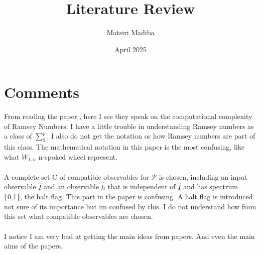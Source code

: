 \documentclass[12pt, a4paper]{Assignment}
\author{Matsiri Madiba}
\date{April 2025}
\title{Literature Review}
\begin{document}
\maketitle
\section*{Comments}

From reading the paper \cite{burr1981generalized}, here I see they speak on the computational complexity of Ramsey Numbers. 
I have a little trouble in understanding Ramsey numbers as a class of $\sum_{2}^{p}$. 
I also do not get the notation or how Ramsey numbers are part of this class.
The mathematical notation in this paper is the most confusing, like what $W_{1,n}$ n-spoked wheel represent.
\\
\\
\cite{Deutsch1989}
A complete set C of compatible observables for $\mathcal{P}$ is chosen, including an input 
observable $\hat{I}$ and an observable $\hat{h}$ that is independent of $\hat{I}$ and has spectrum \{0,1\}, the halt flag. 
This part in the paper is confusing.
A halt flag is introduced not sure of its importance but im confused by this.
I do not understand how from this set what compatible observables are chosen.
\\
\\
I notice I am very bad at getting the main ideas from papers.
And even the main aims of the papers.
\end{document}
